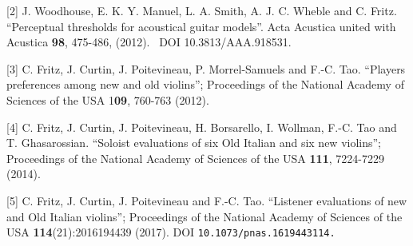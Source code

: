   [2] J. Woodhouse, E. K. Y. Manuel, L. A. Smith, A. J. C. Wheble and C. Fritz. 
  ``Perceptual thresholds for acoustical guitar models''. Acta Acustica united 
  with Acustica\textbf{ 98}, 475-486, (2012).~ DOI 10.3813/AAA.918531. 

  [3] C. Fritz, J. Curtin, J. Poitevineau, P. Morrel-Samuels and F.-C. Tao. 
  ``Players preferences among new and old violins''; Proceedings of the 
  National Academy of Sciences of the USA 1\textbf{09}, 760-763 (2012). 

  [4] C. Fritz, J. Curtin, J. Poitevineau, H. Borsarello, I. Wollman, F.-C. Tao 
  and T. Ghasarossian. ``Soloist evaluations of six Old Italian and six new 
  violins''; Proceedings of the National Academy of Sciences of the USA 
  \textbf{111}, 7224-7229 (2014). 

  [5] C. Fritz, J. Curtin, J. Poitevineau and F.-C. Tao. ``Listener evaluations 
  of new and Old Italian violins''; Proceedings of the National Academy of 
  Sciences of the USA \textbf{114}(21):2016194439 (2017). DOI 
  \tt{}10.1073/pnas.1619443114\rm{}. 